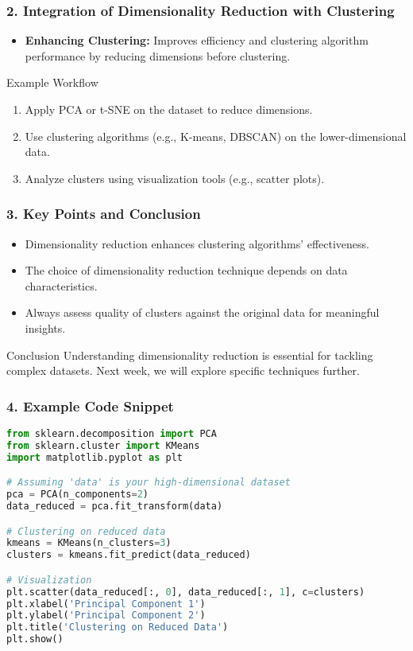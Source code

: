\documentclass[aspectratio=169]{beamer}
\begin{document}
\begin{frame}[fragile]
    \frametitle{2. Integration of Dimensionality Reduction with Clustering}
    \begin{itemize}
        \item \textbf{Enhancing Clustering:} Improves efficiency and clustering algorithm performance by reducing dimensions before clustering.
    \end{itemize}

    \begin{block}{Example Workflow}
        \begin{enumerate}
            \item Apply PCA or t-SNE on the dataset to reduce dimensions.
            \item Use clustering algorithms (e.g., K-means, DBSCAN) on the lower-dimensional data.
            \item Analyze clusters using visualization tools (e.g., scatter plots).
        \end{enumerate}
    \end{block}
\end{frame}

\begin{frame}[fragile]
    \frametitle{3. Key Points and Conclusion}
    \begin{itemize}
        \item Dimensionality reduction enhances clustering algorithms' effectiveness.
        \item The choice of dimensionality reduction technique depends on data characteristics.
        \item Always assess quality of clusters against the original data for meaningful insights.
    \end{itemize}

    \begin{block}{Conclusion}
        Understanding dimensionality reduction is essential for tackling complex datasets. Next week, we will explore specific techniques further.
    \end{block}
\end{frame}

\begin{frame}[fragile]
    \frametitle{4. Example Code Snippet}
    \begin{lstlisting}[language=Python]
from sklearn.decomposition import PCA
from sklearn.cluster import KMeans
import matplotlib.pyplot as plt

# Assuming 'data' is your high-dimensional dataset
pca = PCA(n_components=2)
data_reduced = pca.fit_transform(data)

# Clustering on reduced data
kmeans = KMeans(n_clusters=3)
clusters = kmeans.fit_predict(data_reduced)

# Visualization
plt.scatter(data_reduced[:, 0], data_reduced[:, 1], c=clusters)
plt.xlabel('Principal Component 1')
plt.ylabel('Principal Component 2')
plt.title('Clustering on Reduced Data')
plt.show()
    \end{lstlisting}
\end{frame}
\end{document}
